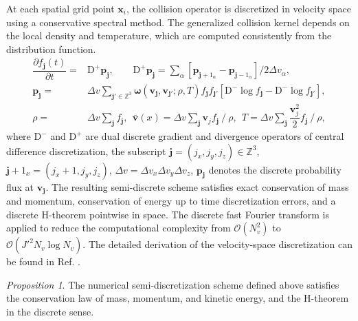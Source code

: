 \documentclass[preprint,1p,times]{elsarticle}
\newcommand{\cO}{\mathcal{O}}
\theoremstyle{definition}
\theoremstyle{remark}
\newtheorem{proposition}{Proposition}
\begin{document}
At each spatial grid point $\bm{x}_{i}$, the collision operator is discretized in velocity space using a conservative spectral method.
The generalized collision kernel depends on the local density and temperature, which are computed consistently from the distribution function.
\begin{equation}
    \begin{aligned}
        \dfrac{\partial f_{\bm{j}}(t)}{\partial t} =& \mathrm{D}^{+} \bm{p}_{\bm{j}}, \qquad 
        \mathrm{D}^{+} \bm{p}_{\bm{j}} = \sum_{\alpha} [\bm{p}_{\bm{j}+1_{\alpha}} - \bm{p}_{\bm{j}-1_{\alpha}}] / 2\Delta v_{\alpha} , \\
        \bm{p}_{\bm{j}} =& \Delta v \sum_{\bm{j}' \in \mathbb{Z}^{3}} \bm{\omega}(\bm{v}_{\bm{j}}, \bm{v}_{\bm{j}'}; \rho, T) f_{\bm{j}} f_{\bm{j}'} \left[ \mathrm{D}^{-} \log f_{\bm{j}} - \mathrm{D}^{-} \log f_{\bm{j}'} \right] , \\
        \rho =& \Delta v \sum_{\bm{j}} f_{\bm{j}}, ~~ \bar{\bm{v}}(x) = \Delta v \sum_{\bm{j}} \bm{v}_{j} f_{\bm{j}} ~ / ~ \rho, ~~ T = \Delta v \sum_{\bm{j}} \dfrac{\bm{v}_{j}^{2}}{2} f_{\bm{j}} ~ / ~ \rho ,
    \end{aligned}
\end{equation}
where $\mathrm{D}^{-}$ and $\mathrm{D}^{+}$ are dual discrete gradient and divergence operators of central difference discretization, the subscript $\bm{j} = (j_{x}, j_{y}, j_{z}) \in \mathbb{Z}^{3}$, $\bm{j}+1_{x} = (j_{x}+1, j_{y}, j_{z})$, $\Delta v = \Delta v_{x} \Delta v_{y} \Delta v_{z}$, $\bm{p}_{\bm{j}}$ denotes the discrete probability flux at $\bm{v}_{\bm{j}}$.
The resulting semi-discrete scheme satisfies exact conservation of mass and momentum, conservation of energy up to time discretization errors, and a discrete H-theorem pointwise in space.
The discrete fast Fourier transform is applied to reduce the computational complexity from $\cO(N_v^2)$ to $\cO(J'^{2} N_v \log N_v)$.
The detailed derivation of the velocity-space discretization can be found in Ref. \cite{zhao2025fast}.





\begin{proposition}
    The numerical semi-discretization scheme defined above satisfies the conservation law of mass, momentum, and kinetic energy, and the H-theorem in the discrete sense.
\end{proposition}
\end{document}
